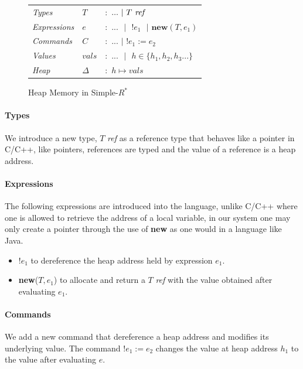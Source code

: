 \documentclass[a4paper,12pt]{report}
\begin{document}
\begin{figure}[H]
  \begin{center}
    \begin{tabular} {l l l}
      \textit{Types} & $T$ & $:$ $...\text{ }|\text{ }T\text{ \textit{ref }}$ \\
      \textit{Expressions} & $e$ & $:$ $...\text{ }|\text{ }!e_1\text{ }|\textbf{ new}(T, e_1)$\\
      \textit{Commands} & $C$ & $:$ $...$ $|$ $!e_1 := e_2$ \\
      \textit{Values} & $vals$& $:$ $...\text{ }|\text{ }h \in \{h_1,h_2, h_3...\} $ \\
      \textit{Heap} & $\Delta$& $:$ $h \mapsto vals$\\
    \end{tabular}
  \end{center}
  \caption{Heap Memory in Simple-$R^{*}$}
  \label{fig:ptr_syntax}
\end{figure}

\paragraph{Types}
We introduce a new type, $T$ \textit{ref} as a reference type that behaves like 
a pointer in C/C++, like pointers, references are typed and the value of a reference 
is a heap address. 

\paragraph{Expressions}
The following expressions are introduced into the language, unlike C/C++ 
where one is allowed to retrieve the address of a local variable, in our 
system one may only create a pointer through the use of \textbf{new} as 
one would in a language like Java.
\begin{itemize}
  \item $!e_1$ to dereference the heap address held by expression $e_1$.
  \item \textbf{new}($T, e_1$) to allocate and return a $T$ \textit{ref} with the 
  value obtained after evaluating $e_1$.
\end{itemize}

\paragraph{Commands}
We add a new command that dereference a heap address and modifies its underlying 
value. The command $!e_1 := e_2$ changes the value at heap address $h_1$ to the 
value after evaluating $e$.
\end{document}
